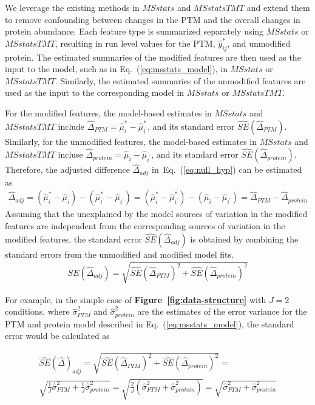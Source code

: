 \documentclass[mcp]{article}
\numberwithin{table}{section}
\def\eqref#1{Eq.~(\ref{eq:#1})}
\def\figref#1{{\bf Figure~\ref{fig:#1}}}
\begin{document}
We leverage the existing methods in $MSstats$ and $MSstatsTMT$ and extend them to remove confounding between changes in the PTM and the overall changes in protein abundance.  Each feature type is summarized separately using $MSstats$ or $MSstatsTMT$, resulting in run level values for the PTM, $\hat{y}_{ij}^{\ast}$, and unmodified protein. The estimated summaries of the modified features are then used as the input to the model, such as in \eqref{msstats_model}, in $MSstats$ or $MSstatsTMT$. Similarly, the estimated summaries of the unmodified features are used as the input to the corresponding model in $MSstats$ or $MSstatsTMT$.

For the modified features, the model-based estimates in $MSstats$ and $MSstatsTMT$ include $\hat{\Delta}_{PTM}=\hat{\mu}^{\ast}_{i}-\hat{\mu}_{i^{\prime}}^{\ast}$, and its standard error $\widehat{SE}(\hat{\Delta}_{PTM})$. Similarly, for the unmodified features, the model-based estimates in $MSstats$ and $MSstatsTMT$ incluse $\hat{\Delta}_{protein}=\hat{\mu}_{i}-\hat{\mu}_{i^{\prime}}$, and its standard error $\widehat{SE}(\hat{\Delta}_{protein})$. Therefore, the adjusted difference $\hat{\Delta}_{adj}$ in~\eqref{null_hyp} can be estimated as
\begin{eqnarray}
\hat{\Delta}_{adj} = (\hat{\mu}^{\ast}_{i}-\hat{\mu}_{i}) - (\hat{\mu}_{i^{\prime}}^{\ast}-\hat{\mu}_{i^{\prime}}) = (\hat{\mu}^{\ast}_{i}-\hat{\mu}_{i^{\prime}}^{\ast}) - (\hat{\mu}_{i}-\hat{\mu}_{i^{\prime}}) = \hat{\Delta}_{PTM} - \hat{\Delta}_{protein} 
\label{eq:Delta_hat_adj}
\end{eqnarray}
Assuming that the unexplained by the model sources of variation in the modified features are independent from the corresponding sources of variation in the modified features, the standard error $\widehat{SE}(\hat{\Delta}_{adj})$ is obtained by combining the standard errors from the unmodified and modified model fits.
\begin{eqnarray}
\widehat{SE}(\hat{\Delta}_{adj}) = \sqrt{ \widehat{SE}(\hat{\Delta}_{PTM})^{2} + \widehat{SE}(\hat{\Delta}_{protein})^{2}} 
\label{eq:prop_se}
\end{eqnarray}

For example, in the simple case of \figref{data-structure} with $J=2$ conditions, where $\hat{\sigma}^2_{PTM}$ and $\hat{\sigma}^2_{protein}$ are the estimates of the error variance for the PTM and protein model described in \eqref{msstats_model}, the standard error would be calculated as

\begin{eqnarray}
& \widehat{SE}(\hat{\Delta})_{adj} = \sqrt{\widehat{SE}(\hat{\Delta}_{PTM})^2 + \widehat{SE}(\hat{\Delta}_{protein})^2} = &\\ 
& \sqrt{\frac{1}{J}\hat{\sigma}^2_{PTM} + \frac{1}{J}\hat{\sigma}^2_{protein}} = \sqrt{\frac{2}{J}(\hat{\sigma}^2_{PTM} + \hat{\sigma}^2_{protein})} = \sqrt{\hat{\sigma}^2_{PTM} + \hat{\sigma}^2_{protein}} & \nonumber
\label{eq:se_calc}
\end{eqnarray}
\end{document}
